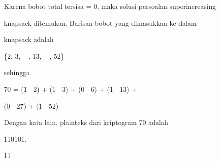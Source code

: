 \documentclass{article}
\begin{document}

Karena bobot total tersisa = 0, maka solusi persoalan superincreasing 

knapsack ditemukan. Barisan bobot yang dimasukkan ke dalam 

knapsack adalah  


\{2, 3, – , 13, – , 52\}  


 sehingga

    70 = (1  2) + (1  3) + (0  6) + (1  13) + 


     (0  27) + (1  52)

 Dengan kata lain, plainteks dari kriptogram 70 adalah


 110101.

11
\end{document}
